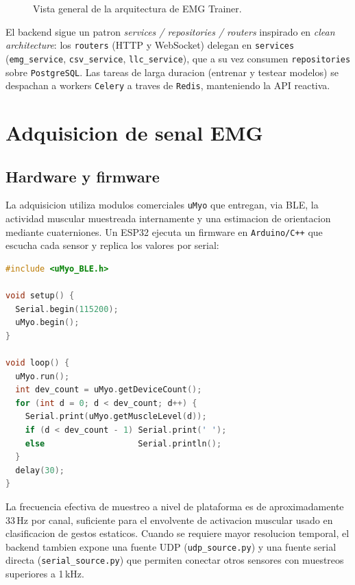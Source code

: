 \documentclass[11pt,a4paper]{article}
\begin{document}
\begin{figure}[H]
  \centering
  \caption{Vista general de la arquitectura de EMG Trainer.}
  \label{fig:arch}
\end{figure}

El backend sigue un patron \emph{services / repositories / routers}
inspirado en \emph{clean architecture}: los \texttt{routers} (HTTP y
WebSocket) delegan en \texttt{services} (\texttt{emg\_service},
\texttt{csv\_service}, \texttt{llc\_service}), que a su vez consumen
\texttt{repositories} sobre \texttt{PostgreSQL}. Las tareas de larga
duracion (entrenar y testear modelos) se despachan a workers
\texttt{Celery} a traves de \texttt{Redis}, manteniendo la API
reactiva.

\section{Adquisicion de senal EMG}
\label{sec:adq}

\subsection{Hardware y firmware}
La adquisicion utiliza modulos comerciales \texttt{uMyo} que entregan,
via BLE, la actividad muscular muestreada internamente y una
estimacion de orientacion mediante cuaterniones. Un ESP32 ejecuta un
firmware en \texttt{Arduino/C++} que escucha cada sensor y replica los
valores por serial:

\begin{lstlisting}[language=C++,caption={Loop principal del firmware
ESP32 (\texttt{hola.ino}).},label={lst:fw}]
#include <uMyo_BLE.h>

void setup() {
  Serial.begin(115200);
  uMyo.begin();
}

void loop() {
  uMyo.run();
  int dev_count = uMyo.getDeviceCount();
  for (int d = 0; d < dev_count; d++) {
    Serial.print(uMyo.getMuscleLevel(d));
    if (d < dev_count - 1) Serial.print(' ');
    else                   Serial.println();
  }
  delay(30);
}
\end{lstlisting}

La frecuencia efectiva de muestreo a nivel de plataforma es de
aproximadamente 33\,Hz por canal, suficiente para el envolvente de
activacion muscular usado en clasificacion de gestos estaticos. Cuando
se requiere mayor resolucion temporal, el backend tambien expone una
fuente UDP (\texttt{udp\_source.py}) y una fuente serial directa
(\texttt{serial\_source.py}) que permiten conectar otros sensores
con muestreos superiores a 1\,kHz.
\end{document}

